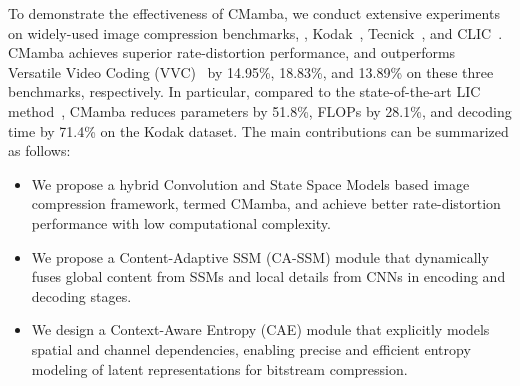 \hypertarget{foot1}{}


\hypertarget{foot2}{}



To demonstrate the effectiveness of CMamba, we conduct extensive experiments on widely-used image compression benchmarks, \ie, Kodak~\cite{franzen1999kodak}, Tecnick~\cite{asuni2014testimages}, and CLIC~\cite{theis2020clic}.
CMamba achieves superior rate-distortion performance, and outperforms Versatile Video Coding (VVC)~\cite{bross2020versatile} by 14.95\%, 18.83\%, and 13.89\% on these three benchmarks, respectively. 
In particular, compared to the state-of-the-art LIC method~\cite{jiang2023mlicpp}, CMamba reduces parameters by 51.8\%, FLOPs by 28.1\%, and decoding time by 71.4\% on the Kodak dataset. 
The main contributions can be summarized as follows:
\begin{itemize}
    \item 
    We propose a hybrid Convolution and State Space Models based image compression framework, termed CMamba, and achieve better rate-distortion performance with low computational complexity.

    \item 
     We propose a Content-Adaptive SSM (CA-SSM) module that dynamically fuses global content from SSMs and local details from CNNs in encoding and decoding stages.

    \item 
    We design a Context-Aware Entropy (CAE) module that explicitly models spatial and channel dependencies, enabling precise and efficient entropy modeling of latent representations for bitstream compression.

\end{itemize}

